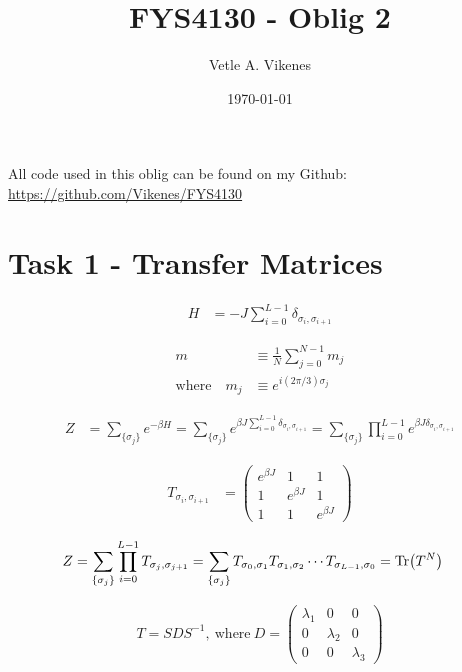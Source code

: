 \documentclass[reprint,english,notitlepage,aps,nobalancelastpage,nofootinbib]{revtex4-1}
\newcommand{\sumstate}{\sum_{\{\sigma_j\}}}
\newcommand{\prodstate}{\prod_{i=0}^{L-1}}
\newcommand{\ebj}{e^{\beta J}}
\newcommand{\T}[1]{T_{\sigma_{#1},\sigma_{#1 + 1}}}
\begin{document}
\begin{center}
\title{\Huge FYS4130 - Oblig 2}
\author{\large Vetle A. Vikenes}
\date{\today}
\noaffiliation


\maketitle
\end{center}
\onecolumngrid

All code used in this oblig can be found on my Github: \url{https://github.com/Vikenes/FYS4130}
\\
\section*{\large Task 1 - Transfer Matrices}

\begin{align} \label{eq:Hamiltonian}
	H &= -J \sum_{i=0}^{L-1} \delta_{\sigma_i,\sigma_{i+1}}
\end{align}

\begin{align}
	m &\equiv \frac{1}{N} \sum_{j=0}^{N-1} m_j \label{eq:order parameter}  \\ 
	\text{where}\quad m_j &\equiv e^{i(2\pi/3)\sigma_j} \label{eq:magnetization}
\end{align}


\begin{align*}
	Z &= \sum_{\{\sigma_j\}} e^{-\beta H} = \sumstate e^{\beta J \sum_{i=0}^{L-1} \delta_{\sigma_i,\sigma_{i+1}}} = \sumstate \prod_{i=0}^{L-1} e^{\beta J \delta_{\sigma_i,\sigma_{i+1}}}
\end{align*}

\begin{align*}
	T_{\sigma_i,\sigma_{i+1}} &= 
	\begin{pmatrix}
		e^{\beta J} & 1 & 1 \\
		1 & \ebj & 1 \\
		1 & 1 & \ebj
	\end{pmatrix}
\end{align*}

\begin{align*}
	Z &= \sumstate \prodstate \T{j} = \sumstate T_{\sigma_0,\sigma_1} T_{\sigma_1,\sigma_2}\cdots T_{\sigma_{L-1},\sigma_0} = \Tr(T^N)
\end{align*}

\begin{align*}
	T = SDS^{-1}, \:\mathrm{where}\: D = \begin{pmatrix}
		\lambda_1 & 0 & 0 \\ 
		0 & \lambda_2 & 0 \\
		0 & 0 & \lambda_3 
	\end{pmatrix}
\end{align*}
\end{document}

